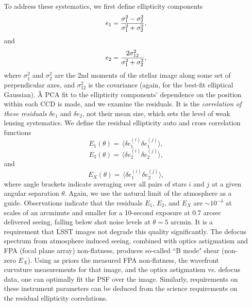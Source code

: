 To address these systematics, we first define ellipticity components
\begin{equation}
 e_1 = {\sigma_1^2 - \sigma_2^2 \over \sigma_1^2 + \sigma_2^2},
\end{equation}
and
\begin{equation}
 e_2 = {2 \sigma_{12}^2 \over \sigma_1^2 + \sigma_2^2},
\end{equation}
where $\sigma_1^2$ and $\sigma_2^2$ are the 2nd moments of the stellar
image along some set of perpendicular axes, and $\sigma_{12}^2$ is the
covariance (again, for the best-fit elliptical Gaussian).  
\G{A PCA fit to the ellipticity components’ dependence on the position within
each CCD is made, and we examine the residuals.}
It is the {\it correlation of these residuals} $\delta e_1$
and $\delta e_2$, not their
mean size, which sets the level of weak lensing systematics.  We
define the residual ellipticity auto and cross correlation functions
\begin{equation}
 E_1(\theta) = \, \langle \delta e_1^{(i)}\delta e_1^{(j)} \rangle,
\end{equation}
\begin{equation}
 E_2(\theta) = \, \langle \delta e_2^{(i)}\delta e_2^{(j)} \rangle,
\end{equation}
and
\begin{equation}
 E_X(\theta) = \, \langle \delta e_1^{(i)}\delta e_2^{(j)} \rangle,
\end{equation}
where angle brackets indicate averaging over all pairs of stars $i$ and
$j$ at a given angular separation $\theta$.  Again, we use the natural
limit of the atmosphere as a guide.  Observations indicate that the residuals $E_1$,
$E_2$, and $E_X$ are $\sim 10^{-4}$ at scales of an arcminute and smaller for
a 10-second exposure at 0.7 arcsec delivered seeing, falling below shot noise
levels at $\theta = 5$ arcmin.  It is a requirement that LSST images not degrade
this quality significantly. The defocus spectrum from atmosphere induced seeing,
combined with optics astigmatism and FPA (focal plane array) non-flatness, produces
so-called ``B mode" shear (non-zero $E_X$). Using as priors the measured FPA non-flatness, the wavefront
curvature measurements for that image, and the optics astigmatism vs. defocus
data,
one can optimally fit the PSF over the image. Similarly, requirements on these
instrument parameters can be deduced from the science requirements on the
residual ellipticity correlations.



